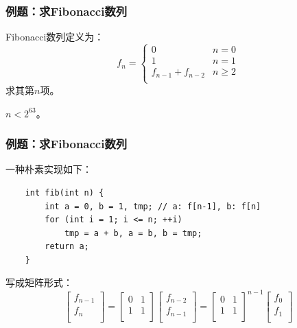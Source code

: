 \documentclass[9pt,dvipsnames]{beamer}
\begin{document}
\begin{frame}
	\frametitle{例题：求Fibonacci数列}
	Fibonacci数列定义为：
	\[ f_n = \left\{\begin{array}{ll}
		0 & n=0 \\
		1 & n=1 \\
		f_{n-1}+f_{n-2} & n\geq 2 \\
	\end{array}\right. \]
	求其第$n$项。

	$n<2^{63}$。
\end{frame}
\begin{frame}[fragile]
	\frametitle{例题：求Fibonacci数列}
	一种朴素实现如下：
	\begin{verbatim}
	int fib(int n) {
		int a = 0, b = 1, tmp; // a: f[n-1], b: f[n]
		for (int i = 1; i <= n; ++i)
			tmp = a + b, a = b, b = tmp;
		return a;
	}
	\end{verbatim}

	\pause 写成矩阵形式：
	\[ \left[\begin{matrix}
		f_{n-1} \\
		f_n \\
	\end{matrix}\right]
	 = \left[\begin{matrix}
		0 & 1 \\
		1 & 1 \\
	\end{matrix}\right]
	\left[\begin{matrix}
		f_{n-2} \\
		f_{n-1} \\
	\end{matrix}\right]
	= \left[\begin{matrix}
		0 & 1 \\
		1 & 1 \\
	\end{matrix}\right]^{n-1}
	\left[\begin{matrix}
		f_0 \\
		f_1 \\
	\end{matrix}\right]\]
\end{frame}
\end{document}
